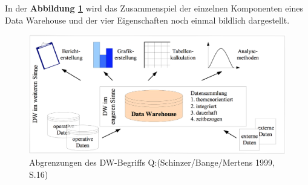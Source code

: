 
In der \textbf{Abbildung \ref{pic:DWOverview}} wird das Zusammenspiel der einzelnen Komponenten eines Data Warehouse und der vier Eigenschaften noch einmal bildlich dargestellt. 

\begin{figure}[H]
    \centering
    \includegraphics[width=1\textwidth]{files/DWOverview}
    \caption{Abgrenzungen des DW-Begriffs Q:(Schinzer/Bange/Mertens 1999, S.16)}
    \label{pic:DWOverview}
\end{figure}



